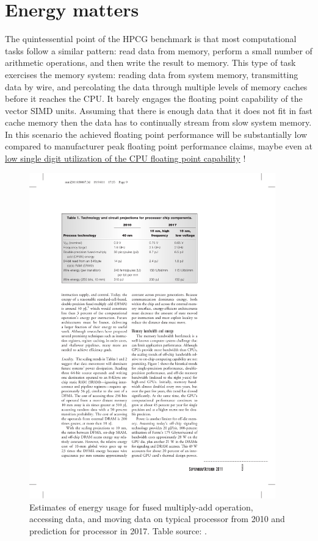 \section{Energy matters}

The quintessential point of the HPCG benchmark is that most computational tasks follow a similar pattern: read data from memory, perform a small number of arithmetic operations, and then write the result to memory. This type of task exercises the memory system: reading data from system memory, transmitting data by wire, and percolating the data through multiple levels of memory caches before it reaches the CPU. It barely engages the floating point capability of the vector SIMD units. Assuming that there is enough data that it does not fit in fast cache memory then the data has to continually stream from slow system memory. In this scenario the achieved floating point performance will be substantially low compared to manufacturer peak floating point performance claims, maybe even at \href{https://www.hpcg-benchmark.org/custom/index.html?lid=155&slid=299}{low single digit utilization of the CPU floating point capability} !


\begin{figure}[htbp!]
    \centering
    \includegraphics[width=0.95\textwidth]{figures/L13/KecklerEfficiencyTable.pdf}
    \caption{Estimates of energy usage for fused multiply-add operation, accessing data, and moving data on typical processor from 2010 and prediction for processor in 2017. Table source: \cite{keckler2011gpus}.}
    \label{processorEnergy.fig}
\end{figure}

